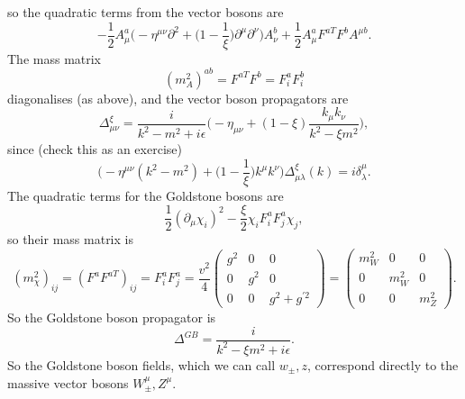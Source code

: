 so the quadratic terms from the vector bosons are
\begin{equation}
-\frac{1}{2}A_\mu^a \bigg(-\eta^{\mu \nu}\partial^2 + \bigg(1-\frac{1}{\xi}\bigg)\partial^\mu \partial^\nu\bigg)A_\nu^b + \frac{1}{2}A_\mu^a F^{a T}F^b A^{\mu b}.
\end{equation}
The mass matrix 
\begin{equation}
(m_A^2)^{ab} = F^{a T}F^b = F_i^aF_i^b
\end{equation}
diagonalises (as above), and the vector boson propagators are
\begin{equation}
\Delta_{\mu \nu }^\xi = \frac{i}{k^2 - m^2 + i\epsilon} \bigg(-\eta_{\mu \nu} + (1-\xi) \frac{k_\mu k_\nu}{k^2 -\xi m^2} \bigg),
\end{equation}
since (check this as an exercise)
\begin{equation}
\bigg( -\eta^{\mu \nu}(k^2 - m^2) + \bigg( 1 - \frac{1}{\xi}\bigg)k^\mu k^\nu \bigg) \Delta_{\mu \lambda}^\xi(k) = i \delta_\lambda^\mu.
\end{equation}
The quadratic terms for the Goldstone bosons are
\begin{equation}
\frac{1}{2}(\partial_\mu \chi_i)^2 - \frac{\xi}{2} \chi_i F_i^a F_j^a \chi_j,
\end{equation}
so their mass matrix is
\begin{equation}
(m_\chi^2)_{ij} = (F^a F^{a T})_{ij} = F^a_i F^a_j = \frac{v^2}{4}
\begin{pmatrix}
g^2 & 0 & 0 \\
0 & g^2 & 0 \\
0 & 0 & g^2 + g^{\prime 2} 
\end{pmatrix}
= \begin{pmatrix}
m_W^2 & 0 & 0 \\
0 & m_W^2 & 0 \\
0 & 0 & m_Z^2
\end{pmatrix}.
\end{equation}
So the Goldstone boson propagator is
\begin{equation}
\Delta^{GB} = \frac{i}{k^2 - \xi m^2 + i\epsilon}.
\end{equation}
So the Goldstone boson fields, which we can call $w_{\pm}, z$, correspond directly to the massive vector bosons $W^\mu_{\pm}, Z^\mu$.

